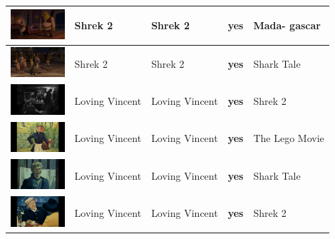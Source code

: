 \documentclass[conference]{IEEEtran}
\begin{document}
\begin{table}[ht]
\begin{tabular}{||P{2cm}|P{1.0cm}|P{1.2cm}|P{1.0cm}|P{1.2cm}||}
  \hline\vspace{0.1cm}
  \includegraphics[width=2cm]{shrek2_2.jpg} & Shrek 2 & Shrek 2 & \textbf{yes} & Mada- gascar\\
  
  \hline\vspace{0.1cm}
  \includegraphics[width=2cm]{shrek2_3.jpg} & Shrek 2 & Shrek 2 & \textbf{yes} & Shark Tale\\
  
  
  
  
  \hline\vspace{0.1cm}
  \includegraphics[width=2cm]{vincent_0.png} & Loving Vincent & Loving Vincent & \textbf{yes} & Shrek 2\\
  
  \hline\vspace{0.1cm}
  \includegraphics[width=2cm]{vincent_1.png} & Loving Vincent & Loving Vincent & \textbf{yes} & The Lego Movie\\
  
  \hline\vspace{0.1cm}
  \includegraphics[width=2cm]{vincent_2.png} & Loving Vincent & Loving Vincent & \textbf{yes} & Shark Tale\\
  
  \hline\vspace{0.1cm}
  \includegraphics[width=2cm]{vincent_3.png} & Loving Vincent & Loving Vincent & \textbf{yes} & Shrek 2\\

  \hline
  \end{tabular}
\end{table}
\end{document}
